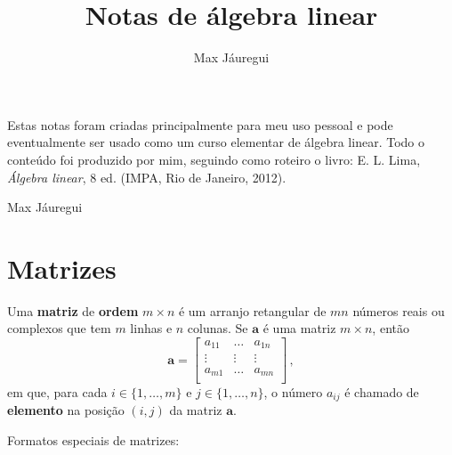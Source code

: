 \documentclass[12pt,a4paper]{report}
\title{Notas de álgebra linear}
\author{Max Jáuregui}
\newcommand{\tb}{\textbf}
\newcommand{\mb}{\mathbf}
\begin{document}
\maketitle
  Estas notas foram criadas principalmente para meu uso pessoal e pode eventualmente ser usado como um curso elementar de álgebra linear. Todo o conteúdo foi produzido por mim, seguindo como roteiro o livro: E. L. Lima, \textit{Álgebra linear}, 8 ed. (IMPA, Rio de Janeiro, 2012).

  \begin{flushright}
    Max Jáuregui
  \end{flushright}
\tableofcontents

\chapter{Matrizes}

Uma \tb{matriz} de \tb{ordem} $m\times n$ é um arranjo retangular de $mn$ números reais ou complexos que tem $m$ linhas e $n$ colunas. Se $\mb{a}$ é uma matriz $m\times n$, então
$$\mb{a}=\begin{bmatrix}
  a_{11}&\ldots&a_{1n}\\
  \vdots&\vdots&\vdots\\
  a_{m1}&\ldots&a_{mn}\\
\end{bmatrix}\,,$$
em que, para cada $i\in\{1,\ldots,m\}$ e $j\in\{1,\ldots,n\}$, o número $a_{ij}$ é chamado de \tb{elemento} na posição $(i,j)$ da matriz $\mb{a}$.

Formatos especiais de matrizes:
\end{document}
